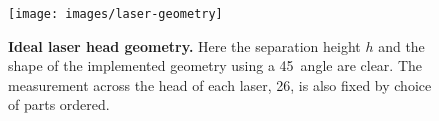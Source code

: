\begin{figure}
  \begin{minipage}{0.5\linewidth}
    \texttt{[image: images/laser-geometry]}
  \end{minipage}
  \begin{minipage}{0.49\linewidth}
    \caption{\textbf{Ideal laser head geometry.} Here the separation
      height $h$ and the shape of the implemented geometry using a
      45\degree\ angle are clear. The measurement across the head of
      each laser, 26\mm, is also fixed by choice of parts ordered.}
  \end{minipage}
  \label{fig:ideal-laser-geometry}
\end{figure}




